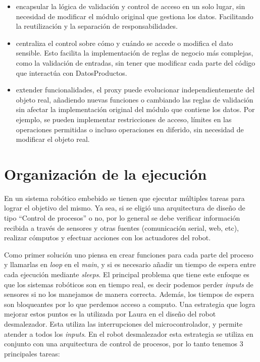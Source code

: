 \begin{itemize}
    \item encapsular la lógica de validación y control de acceso en un solo lugar, sin necesidad de modificar el módulo original que gestiona los datos. Facilitando la reutilización y la separación de responsabilidades.

    \item centraliza el control sobre cómo y cuándo se accede o modifica el dato sensible. Esto facilita la implementación de reglas de negocio más complejas, como la validación de entradas, sin tener que modificar cada parte del código que interactúa con DatosProductos.

    \item extender funcionalidades, el proxy puede evolucionar independientemente del objeto real, añadiendo nuevas funciones o cambiando las reglas de validación sin afectar la implementación original del módulo que contiene los datos. Por ejemplo, se pueden implementar restricciones de acceso, límites en las operaciones permitidas o incluso operaciones en diferido, sin necesidad de modificar el objeto real.
\end{itemize}

\section{Organización de la ejecución}

En un sistema robótico embebido se tienen que ejecutar múltiples tareas para lograr el objetivo del mismo. Ya sea, si se eligió una arquitectura de diseño de tipo ``Control de procesos'' o no, por lo general se debe verificar información recibida a través de sensores y otras fuentes (comunicación serial, web, etc), realizar cómputos y efectuar acciones con los actuadores del robot.

Como primer solución uno piensa en crear funciones para cada parte del proceso y llamarlas en \textit{loop} en el \textit{main}, y si es necesario añadir un tiempo de espera entre cada ejecución mediante \textit{sleeps}. El principal problema que tiene este enfoque es que los sistemas robóticos son en tiempo real, es decir podemos perder \textit{inputs} de sensores si no los manejamos de manera correcta. Además, los tiempos de espera son bloqueantes por lo que perdemos acceso a computo. Una estrategia que logra mejorar estos puntos es la utilizada por Laura en el diseño del robot desmalezador. Esta utiliza las interrupciones del microcontrolador, y permite atender a todos los \textit{inputs}. En el robot desmalezador esta estrategia se utiliza en conjunto con una arquitectura de control de procesos, por lo tanto tenemos 3 principales tareas:

